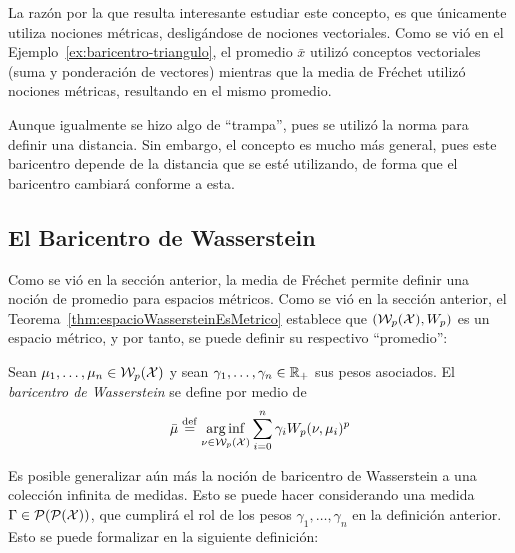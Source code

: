 {{{		  \begin{remark}
			  La razón por la que resulta interesante estudiar este concepto, es que únicamente utiliza nociones métricas, desligándose de nociones vectoriales. Como se vió en el Ejemplo~\ref{ex:baricentro-triangulo}, el promedio $\bar x$ utilizó conceptos vectoriales (suma y ponderación de vectores) mientras que la media de Fréchet utilizó nociones métricas, resultando en el mismo promedio.

			  Aunque igualmente se hizo algo de ``trampa'', pues se utilizó la norma para definir una distancia. Sin embargo, el concepto es mucho más general, pues este baricentro depende de la distancia que se esté utilizando, de forma que el baricentro cambiará conforme a esta.
		  \end{remark}

	  }  %

	  \subsection*{El Baricentro de Wasserstein}\label{ssec:el-baricentro-de-Wasserstein}
	  {
		  Como se vió en la sección anterior, la media de Fréchet permite definir una noción de promedio para espacios métricos. Como se vió en la sección anterior, el Teorema~\ref{thm:espacioWassersteinEsMetrico} establece que $(\WassersteinSpace[p]{\cX}, W_p)$ es un espacio métrico, y por tanto, se puede definir su respectivo ``promedio'':

		  \begin{definition}
			  Sean $\mu_1,\ldots, \mu_n \in \WassersteinSpace[p]{\cX} $ y sean $\gamma_1,\ldots, \gamma_n \in \R_+$ sus pesos asociados. El \emph{baricentro de Wasserstein} se define por medio de
			  \begin{equation}
				  \bar \mu \eqdef \arginf_{\nu \in \WassersteinSpace[p]{\cX} } \sum_{i=0}^{n} \gamma_i \Wasserstein[p]{\nu}{\mu_i}^p
			  \end{equation}

		  \end{definition}

		  Es posible generalizar aún más la noción de baricentro de Wasserstein a una colección infinita de medidas. Esto se puede hacer considerando una medida $\Gamma \in \ProbSpace[\ProbSpace ] $, que cumplirá el rol de los pesos $\gamma_1,\ldots, \gamma_n $ en la definición anterior. Esto se puede formalizar en la siguiente definición:

}}}
